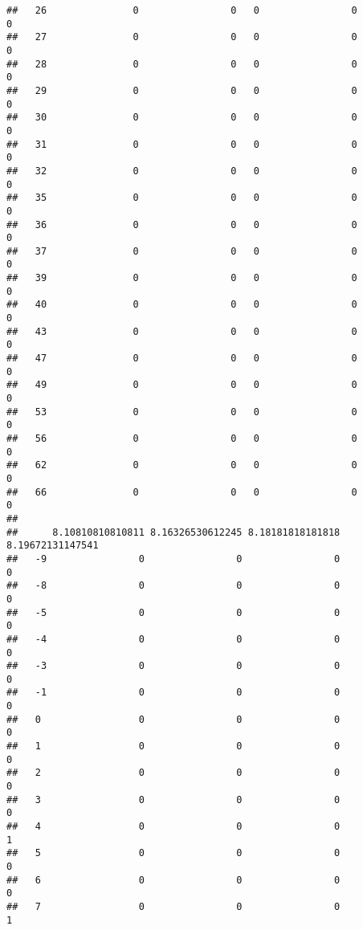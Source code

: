 \documentclass[]{article}
\begin{document}
\begin{verbatim}
##   26               0                0   0                0                0
##   27               0                0   0                0                0
##   28               0                0   0                0                0
##   29               0                0   0                0                0
##   30               0                0   0                0                0
##   31               0                0   0                0                0
##   32               0                0   0                0                0
##   35               0                0   0                0                0
##   36               0                0   0                0                0
##   37               0                0   0                0                0
##   39               0                0   0                0                0
##   40               0                0   0                0                0
##   43               0                0   0                0                0
##   47               0                0   0                0                0
##   49               0                0   0                0                0
##   53               0                0   0                0                0
##   56               0                0   0                0                0
##   62               0                0   0                0                0
##   66               0                0   0                0                0
##     
##      8.10810810810811 8.16326530612245 8.18181818181818 8.19672131147541
##   -9                0                0                0                0
##   -8                0                0                0                0
##   -5                0                0                0                0
##   -4                0                0                0                0
##   -3                0                0                0                0
##   -1                0                0                0                0
##   0                 0                0                0                0
##   1                 0                0                0                0
##   2                 0                0                0                0
##   3                 0                0                0                0
##   4                 0                0                0                1
##   5                 0                0                0                0
##   6                 0                0                0                0
##   7                 0                0                0                1

\end{verbatim}
\end{document}

